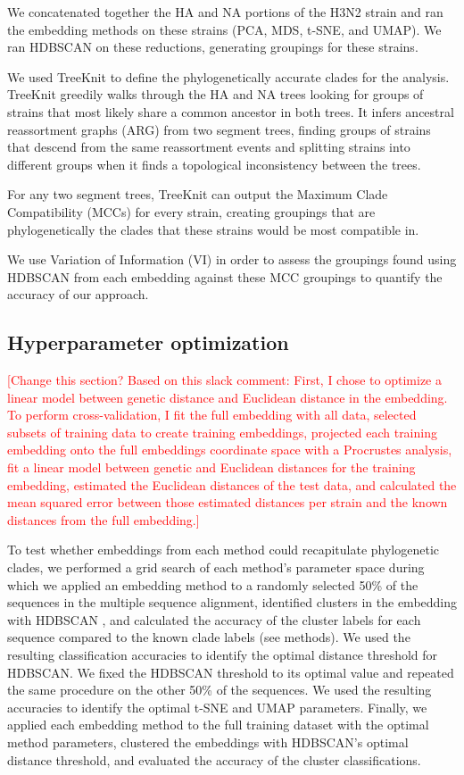 \documentclass[10pt,letterpaper]{article}
\def\jhc#1{\textcolor{red}{[#1]}}
\begin{document}
We concatenated together the HA and NA portions of the H3N2 strain and ran the embedding methods on these strains (PCA, MDS, t-SNE, and UMAP).
We ran HDBSCAN \citep{campello2015hierarchical} on these reductions, generating groupings for these strains.

We used TreeKnit \citep{barrat2022treeknit} to define the phylogenetically accurate clades for the analysis.
TreeKnit greedily walks through the HA and NA trees looking for groups of strains that most likely share a common ancestor in both trees.
It infers ancestral reassortment graphs (ARG) from two segment trees, finding groups of strains that descend from the same reassortment events and splitting strains into different groups when it finds a topological inconsistency between the trees.

For any two segment trees, TreeKnit can output the Maximum Clade Compatibility (MCCs) for every strain, creating groupings that are phylogenetically the clades that these strains would be most compatible in.

We use Variation of Information (VI) in order to assess the groupings found using HDBSCAN from each embedding against these MCC groupings to quantify the accuracy of our approach.

\subsection*{Hyperparameter optimization}

\jhc{Change this section? Based on this slack comment: First, I chose to optimize a linear model between genetic distance and Euclidean distance in the embedding. To perform cross-validation, I fit the full embedding with all data, selected subsets of training data to create training embeddings, projected each training embedding onto the full embeddings coordinate space with a Procrustes analysis, fit a linear model between genetic and Euclidean distances for the training embedding, estimated the Euclidean distances of the test data, and calculated the mean squared error between those estimated distances per strain and the known distances from the full embedding.}

To test whether embeddings from each method could recapitulate phylogenetic clades, we performed a grid search of each method's parameter space during which we applied an embedding method to a randomly selected 50\% of the sequences in the multiple sequence alignment, identified clusters in the embedding with HDBSCAN \citep{hdbscan}, and calculated the accuracy of the cluster labels for each sequence compared to the known clade labels (see methods).
We used the resulting classification accuracies to identify the optimal distance threshold for HDBSCAN.
We fixed the HDBSCAN threshold to its optimal value and repeated the same procedure on the other 50\% of the sequences.
We used the resulting accuracies to identify the optimal t-SNE and UMAP parameters.
Finally, we applied each embedding method to the full training dataset with the optimal method parameters, clustered the embeddings with HDBSCAN's optimal distance threshold, and evaluated the accuracy of the cluster classifications.
\end{document}
